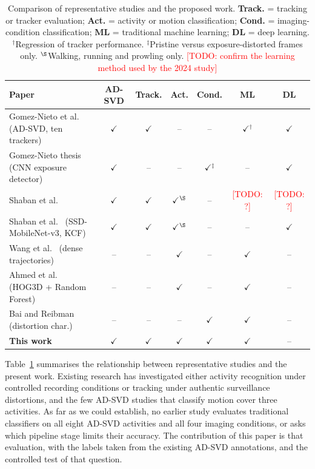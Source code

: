 \documentclass[runningheads]{llncs}
\newcommand{\todo}[1]{\textcolor{red}{[TODO: #1]}}
\begin{document}
\begin{table}[htbp]
\centering
\caption{Comparison of representative studies and the proposed work.
\textbf{Track.} = tracking or tracker evaluation; \textbf{Act.} = activity or motion
classification; \textbf{Cond.} = imaging-condition classification;
\textbf{ML} = traditional machine learning; \textbf{DL} = deep learning.
$^{\dagger}$Regression of tracker performance. $^{\ddagger}$Pristine versus exposure-distorted frames only.
$^{\S}$Walking, running and prowling only. \todo{confirm the learning method used by the 2024 study}}
\label{tab:comparison}
\scriptsize
\setlength{\tabcolsep}{1.8pt}
\renewcommand{\arraystretch}{0.95}
\begin{tabular}{@{}l c c c c c c@{}}
\toprule
\textbf{Paper} & \textbf{AD-SVD} & \textbf{Track.} & \textbf{Act.} &
\textbf{Cond.} & \textbf{ML} & \textbf{DL} \\
\midrule
Gomez-Nieto et al.~\cite{9698081} (AD-SVD, ten trackers) &
$\checkmark$ & $\checkmark$ & -- & -- & $\checkmark$$^{\dagger}$ & $\checkmark$ \\
Gomez-Nieto thesis~\cite{gomeznieto2021thesis} (CNN exposure detector) &
$\checkmark$ & -- & -- & $\checkmark$$^{\ddagger}$ & -- & $\checkmark$ \\
Shaban et al.~\cite{shaban2024abnormal} &
$\checkmark$ & $\checkmark$ & $\checkmark$$^{\S}$ & -- & \todo{?} & \todo{?} \\
Shaban et al.~\cite{shaban2025multicamera} (SSD-MobileNet-v3, KCF) &
$\checkmark$ & $\checkmark$ & $\checkmark$$^{\S}$ & -- & -- & $\checkmark$ \\
Wang et al.~\cite{wang2012dense} (dense trajectories) &
-- & -- & $\checkmark$ & -- & $\checkmark$ & -- \\
Ahmed et al.~\cite{ahmed2017action} (HOG3D + Random Forest) &
-- & -- & $\checkmark$ & -- & $\checkmark$ & -- \\
Bai and Reibman~\cite{bai2016characterizing} (distortion char.) &
-- & -- & -- & $\checkmark$ & $\checkmark$ & -- \\
\textbf{This work} &
$\checkmark$ & $\checkmark$ & $\checkmark$ & $\checkmark$ & $\checkmark$ & -- \\
\bottomrule
\end{tabular}
\end{table}

Table~\ref{tab:comparison} summarises the relationship between representative 
studies and the present work. Existing research has investigated either activity 
recognition under controlled recording conditions or tracking under authentic 
surveillance distortions, and the few AD-SVD studies that classify motion cover three 
activities. As far as we could establish, no earlier study evaluates traditional 
classifiers on all eight AD-SVD activities and all four imaging conditions, or asks 
which pipeline stage limits their accuracy. The contribution of this paper is that 
evaluation, with the labels taken from the existing AD-SVD annotations, and the 
controlled test of that question.
\end{document}
